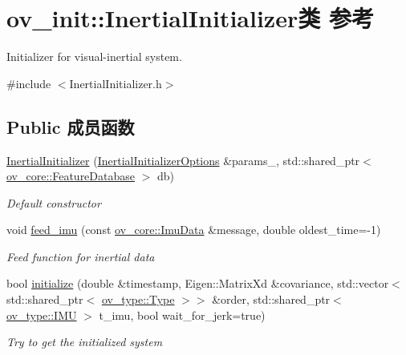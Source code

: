 \hypertarget{classov__init_1_1InertialInitializer}{}\section{ov\+\_\+init\+:\+:Inertial\+Initializer类 参考}
\label{classov__init_1_1InertialInitializer}


Initializer for visual-\/inertial system.  




{\ttfamily \#include $<$Inertial\+Initializer.\+h$>$}

\subsection*{Public 成员函数}
\begin{DoxyCompactItemize}
\item 
\hyperlink{classov__init_1_1InertialInitializer_ab53c9effb332d8259cd04e06ab26ce5f}{Inertial\+Initializer} (\hyperlink{structov__init_1_1InertialInitializerOptions}{Inertial\+Initializer\+Options} \&params\+\_\+, std\+::shared\+\_\+ptr$<$ \hyperlink{classov__core_1_1FeatureDatabase}{ov\+\_\+core\+::\+Feature\+Database} $>$ db)
\begin{DoxyCompactList}\small\item\em Default constructor \end{DoxyCompactList}\item 
void \hyperlink{classov__init_1_1InertialInitializer_ac7f060d9cfedc4f780574ad436c34b66}{feed\+\_\+imu} (const \hyperlink{structov__core_1_1ImuData}{ov\+\_\+core\+::\+Imu\+Data} \&message, double oldest\+\_\+time=-\/1)
\begin{DoxyCompactList}\small\item\em Feed function for inertial data \end{DoxyCompactList}\item 
bool \hyperlink{classov__init_1_1InertialInitializer_aa2288d134687ccf1b7ee85ddcf982991}{initialize} (double \&timestamp, Eigen\+::\+Matrix\+Xd \&covariance, std\+::vector$<$ std\+::shared\+\_\+ptr$<$ \hyperlink{classov__type_1_1Type}{ov\+\_\+type\+::\+Type} $>$$>$ \&order, std\+::shared\+\_\+ptr$<$ \hyperlink{classov__type_1_1IMU}{ov\+\_\+type\+::\+I\+MU} $>$ t\+\_\+imu, bool wait\+\_\+for\+\_\+jerk=true)
\begin{DoxyCompactList}\small\item\em Try to get the initialized system \end{DoxyCompactList}\end{DoxyCompactItemize}
